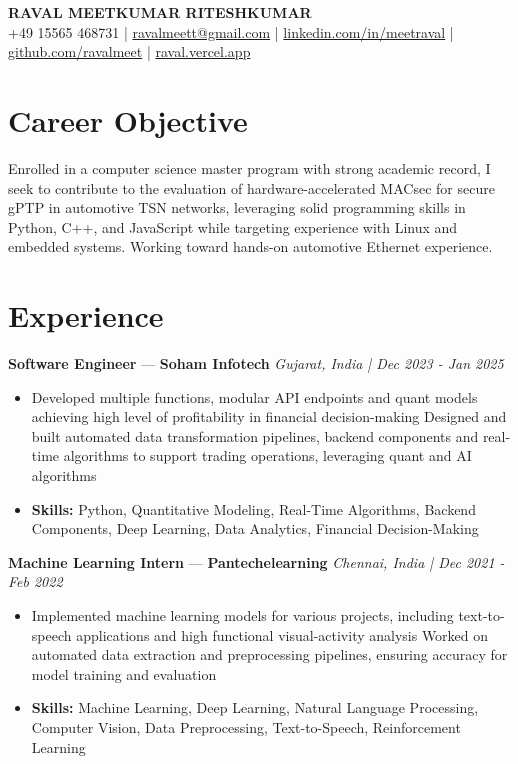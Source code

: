 \documentclass[a4paper,10pt]{article}
\begin{document}
\begin{center}
  {\Large\bfseries RAVAL MEETKUMAR RITESHKUMAR}\\[2pt]
  {\small +49 15565 468731 \;|\; \href{mailto:ravalmeett@gmail.com}{ravalmeett@gmail.com} \;|\; \href{https://www.linkedin.com/in/meetraval/}{linkedin.com/in/meetraval} \;|\; \href{https://github.com/ravalmeet}{github.com/ravalmeet} \;|\; \href{https://raval.vercel.app/}{raval.vercel.app}}
\end{center}
\vspace{-3pt}

\section*{Career Objective}
Enrolled in a computer science master program with strong academic record, I seek to contribute to the evaluation of hardware-accelerated MACsec for secure gPTP in automotive TSN networks, leveraging solid programming skills in Python, C++, and JavaScript while targeting experience with Linux and embedded systems. Working toward hands-on automotive Ethernet experience.\par

\section*{Experience}
\textbf{Software Engineer} — \textbf{Soham Infotech} \hfill \textit{Gujarat, India \;|\; Dec 2023 - Jan 2025}\par
\vspace{1pt}
\begin{itemize}
  \item Developed multiple functions, modular API endpoints and quant models achieving high level of profitability in financial decision-making Designed and built automated data transformation pipelines, backend components and real-time algorithms to support trading operations, leveraging quant and AI algorithms
  \item \textbf{Skills:} Python, Quantitative Modeling, Real-Time Algorithms, Backend Components, Deep Learning, Data Analytics, Financial Decision-Making
\end{itemize}
\vspace{3pt}
\textbf{Machine Learning Intern} — \textbf{Pantechelearning} \hfill \textit{Chennai, India \;|\; Dec 2021 - Feb 2022}\par
\vspace{1pt}
\begin{itemize}
  \item Implemented machine learning models for various projects, including text-to-speech applications and high functional visual-activity analysis Worked on automated data extraction and preprocessing pipelines, ensuring accuracy for model training and evaluation
  \item \textbf{Skills:} Machine Learning, Deep Learning, Natural Language Processing, Computer Vision, Data Preprocessing, Text-to-Speech, Reinforcement Learning
\end{itemize}
\end{document}
